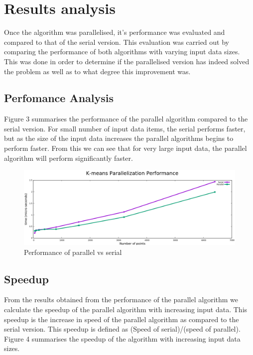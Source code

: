 \documentclass[12pt]{article}
\begin{document}
  	\section{Results analysis}
    	\begin{flushleft}
			Once the algorithm was parallelised, it’s performance was evaluated and compared to that of the serial version. This evaluation was carried out by comparing the performance of both algorithms with varying input data sizes. This was done in order to determine if the parallelised version has indeed solved the problem as well as to what degree this improvement was.
    	\end{flushleft}
    	
    	\subsection{Perfomance Analysis}
    		\begin{flushleft}
    			Figure 3 summarises the performance of the parallel algorithm compared to the serial version. For small number of input data items, the serial performs faster, but as the size of the input data increases the parallel algorithms begins to perform faster. From this we can see that for very large input data, the parallel algorithm will perform significantly faster.
    		\end{flushleft}
    		
    		\begin{figure}
    			\begin{center}
    				\includegraphics[scale=0.4]{performance.png}
    			\end{center}
    			\caption{Performance of parallel vs serial}
    		\end{figure}
    		
    	\subsection{Speedup}
    		\begin{flushleft}
    			From the results obtained from the performance of the parallel algorithm we calculate the speedup of the parallel algorithm with increasing input data. This speedup is the increase in speed of the parallel algorithm as compared to the serial version. This speedup is defined as (Speed of serial)/(speed of parallel). Figure 4 summarises the speedup of the algorithm with increasing input data sizes.
    		\end{flushleft}
    		
\end{document}
